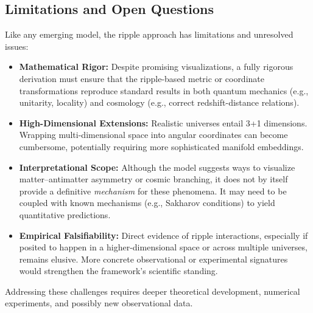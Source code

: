 \documentclass[11pt]{article}
\begin{document}
\subsection{Limitations and Open Questions}
\label{subsec:limitations-open}
Like any emerging model, the ripple approach has limitations and unresolved 
issues:
\begin{itemize}
  \item \textbf{Mathematical Rigor:} 
    Despite promising visualizations, a fully rigorous derivation must ensure 
    that the ripple-based metric or coordinate transformations reproduce 
    standard results in both quantum mechanics (e.g., unitarity, locality) 
    and cosmology (e.g., correct redshift-distance relations).
  \item \textbf{High-Dimensional Extensions:} 
    Realistic universes entail 3+1 dimensions. Wrapping multi-dimensional 
    space into angular coordinates can become cumbersome, potentially 
    requiring more sophisticated manifold embeddings.
  \item \textbf{Interpretational Scope:} 
    Although the model suggests ways to visualize matter--antimatter asymmetry 
    or cosmic branching, it does not by itself provide a definitive \emph{mechanism} 
    for these phenomena. It may need to be coupled with known mechanisms (e.g., 
    Sakharov conditions) to yield quantitative predictions.
  \item \textbf{Empirical Falsifiability:} 
    Direct evidence of ripple interactions, especially if posited to happen 
    in a higher-dimensional space or across multiple universes, remains 
    elusive. More concrete observational or experimental signatures 
    would strengthen the framework’s scientific standing.
\end{itemize}
Addressing these challenges requires deeper theoretical development, numerical 
experiments, and possibly new observational data.
\end{document}
